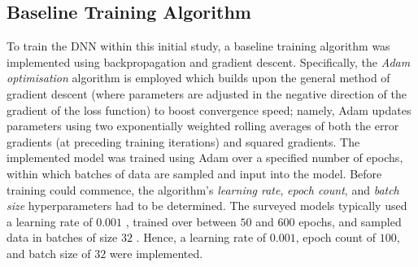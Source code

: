 \documentclass[a4paper, 11pt]{report}
\begin{document}
    \subsection{Baseline Training Algorithm}

    To train the DNN within this initial study, a baseline training algorithm was implemented using backpropagation and gradient descent. Specifically, the \emph{Adam optimisation} algorithm \citep{adam} is employed which builds upon the general method of gradient descent (where parameters are adjusted in the negative direction of the gradient of the loss function) to boost convergence speed; namely, Adam updates parameters using two exponentially weighted rolling averages of both the error gradients (at preceding training iterations) and squared gradients. The implemented model was trained using Adam over a specified number of epochs, within which batches of data are sampled and input into the model. Before training could commence, the algorithm's \emph{learning rate}, \emph{epoch count}, and \emph{batch size} hyperparameters had to be determined. The surveyed models typically used a learning rate of $0.001$ \citep{zhang-2022}, trained over between $50$ \citep{rahimikia-2020} and $600$ \citep{xiong-2016} epochs, and sampled data in batches of size $32$ \citep{xiong-2016}. Hence, a learning rate of $0.001$, epoch count of $100$, and batch size of $32$ were implemented.
\end{document}
